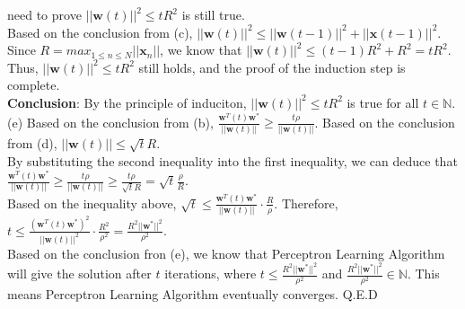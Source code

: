 \documentclass{article}
\begin{document}
    need to prove $||\mathbf{w}(t)||^2 \leq tR^2$ is still true.\\
    Based on the conclusion from (c), $||\mathbf{w}(t)||^2 \leq ||\mathbf{w}(t-1)||^2 + ||\mathbf{x}(t-1)||^2$.
    Since $R = max_{1 \leq n \leq N}||\mathbf{x}_n||$, we know that $||\mathbf{w}(t)||^2 \leq (t-1)R^2 + R^2 =
    tR^2$.\\
    Thus, $||\mathbf{w}(t)||^2 \leq tR^2$ still holds, and the proof of the induction step is complete.\\
    \textbf{Conclusion}: By the principle of induciton, $||\mathbf{w}(t)||^2 \leq tR^2$ is true for all 
    $t \in \mathbb{N}$.\\
    (e) Based on the conclusion from (b), $\frac{\mathbf{w}^T(t)\mathbf{w^*}}{||\mathbf{w}(t)||} \geq 
    \frac{t\rho}{||\mathbf{w}(t)||}$. Based on the conclusion from (d), $||\mathbf{w}(t)|| \leq \sqrt{t}R$.\\
    By substituting the second inequality into the first inequality, we can deduce that 
    $\frac{\mathbf{w}^T(t)\mathbf{w^*}}{||\mathbf{w}(t)||} \geq \frac{t\rho}{||\mathbf{w}(t)||} \geq 
    \frac{t\rho}{\sqrt{t}R} = \sqrt{t}\frac{\rho}{R}$.\\
    Based on the inequality above, $\sqrt{t} \leq 
    \frac{\mathbf{w}^T(t)\mathbf{w^*}}{||\mathbf{w}(t)||} \cdot \frac{R}{\rho}$. Therefore, $t \leq
    \frac{(\mathbf{w}^T(t)\mathbf{w^*})^2}{||\mathbf{w}(t)||^2} \cdot \frac{R^2}{\rho^2} = 
    \frac{R^2||\mathbf{w^*}||^2}{\rho^2}$.\\
    Based on the conclusion fron (e), we know that Perceptron Learning Algorithm will give the solution after 
    $t$ iterations, where $t \leq \frac{R^2||\mathbf{w^*}||^2}{\rho^2}$ and 
    $\frac{R^2||\mathbf{w^*}||^2}{\rho^2} \in \mathbb{N}$. This means Perceptron Learning Algorithm
    eventually converges. Q.E.D
    
\end{document}
